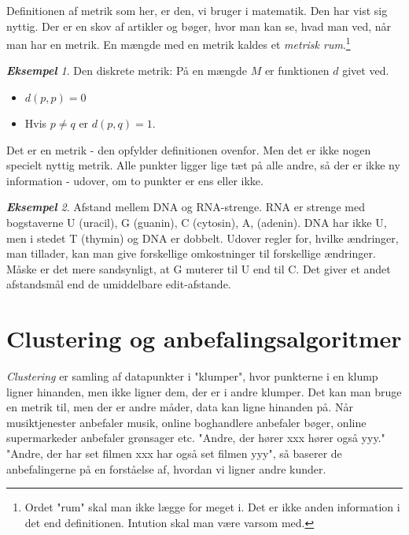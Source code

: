 \documentclass[a4paper, 12pt]{article}
\theoremstyle{remark}
\newtheorem{Eksempel}{\textbf{Eksempel}}
\begin{document}
Definitionen af metrik som her, er den, vi bruger i matematik. Den har vist sig nyttig. Der er en skov af artikler og bøger, hvor man kan se, hvad man ved, når man har  en metrik. En mængde med en metrik kaldes et \emph{metrisk rum}.\footnote{Ordet "rum" skal man ikke lægge for meget i. Det er ikke anden information i det end definitionen. Intution skal man være varsom med.}
\begin{Eksempel}
Den diskrete metrik: På en mængde $M$ er funktionen $d$ givet ved. 
\begin{itemize}
\item $d(p,p)=0$
\item Hvis $p\neq q$ er $d(p,q)=1$.
\end{itemize}
Det er en metrik - den opfylder definitionen ovenfor. Men det er ikke nogen specielt nyttig metrik. Alle punkter ligger lige tæt på alle andre, så der er ikke ny information - udover, om  to punkter er ens eller ikke.
\end{Eksempel}
\begin{Eksempel} Afstand mellem DNA og RNA-strenge. RNA er strenge med bogstaverne U (uracil), G (guanin), C (cytosin), A, (adenin). DNA har ikke U, men i stedet T (thymin) og DNA er dobbelt. 
 Udover regler for, hvilke ændringer, man tillader, kan man give forskellige omkostninger til forskellige ændringer. Måske er det mere sandsynligt, at G muterer til U  end til C. Det giver et andet afstandsmål end de umiddelbare edit-afstande. 
\end{Eksempel}

\section*{Clustering og anbefalingsalgoritmer}

\emph{Clustering} er samling af datapunkter i "klumper", hvor punkterne i en klump ligner hinanden, men ikke ligner dem, der er i andre klumper. Det kan man bruge en metrik til, men der er andre måder, data kan ligne hinanden på. Når musiktjenester anbefaler musik, online boghandlere anbefaler bøger, online supermarkeder anbefaler grønsager etc. "Andre, der hører xxx hører også yyy." "Andre, der har set filmen xxx har også set filmen yyy", så baserer de anbefalingerne på en forståelse af, hvordan vi ligner andre kunder. 
\end{document}
